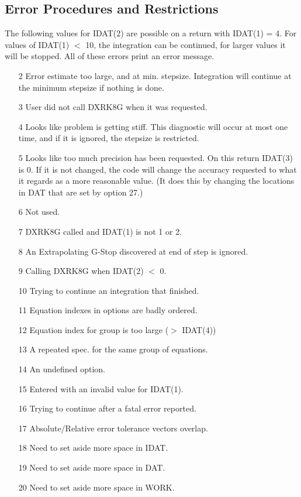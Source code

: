 \documentclass[twoside]{MATH77}
\begin{document}
\subsection{Error Procedures and Restrictions}
The following values for IDAT(2) are possible on a return with IDAT(1) =
4.  For values of IDAT(1) $<$ 10, the integration can be continued, for
larger values it will be stopped.  All of these errors print an error
message.
\begin{itemize}
\item[2]  Error estimate too large, and at min. stepsize.  Integration
will continue at the minimum stepsize if nothing is done.
\item[3]  User did not call DXRK8G when it was requested.
\item[4]  Looks like problem is getting stiff.  This diagnostic will
  occur at most one time, and if it is ignored, the stepsize is restricted.
\item[5] Looks like too much precision has been requested.  On this return
IDAT(3) is 0.  If it is not changed, the code will change the accuracy
requested to what it regards as a more reasonable value.  (It does this
by changing the locations in DAT that are set by option 27.)
\item[6]  Not used.
\item[7] DXRK8G called and IDAT(1) is not 1 or 2.
\item[8] An Extrapolating G-Stop discovered at end of step is ignored.
\item[9] Calling DXRK8G when IDAT(2) $<$ 0.
\item[10] Trying to continue an integration that finished.
\item[11] Equation indexes in options are badly ordered.
\item[12] Equation index for group is too large ($>$ IDAT(4))
\item[13] A repeated spec. for the same group of equations.
\item[14] An undefined option.
\item[15] Entered with an invalid value for IDAT(1).
\item[16] Trying to continue after a fatal error reported.
\item[17] Absolute/Relative error tolerance vectors overlap.
\item[18] Need to set aside more space in IDAT.
\item[19] Need to set aside more space in DAT.
\item[20] Need to set aside more space in WORK.

\end{itemize}
\end{document}

